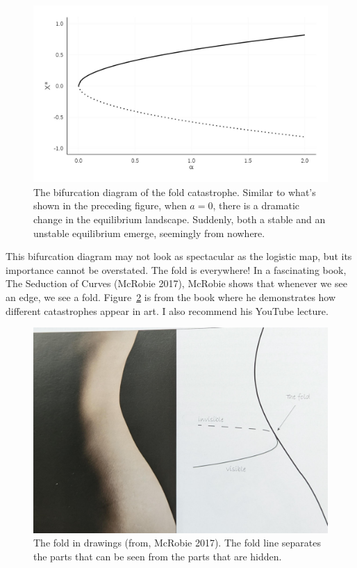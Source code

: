 \documentclass[
  a4paper,
  DIV=11,
  numbers=noendperiod]{scrreprt}
\begin{document}
\begin{figure}

{\centering \includegraphics{media/ch3/fig-ch3-img5-old-17.jpg}

}

\caption{\label{fig-ch3-img5-old-17}The bifurcation diagram of the fold
catastrophe. Similar to what's shown in the preceding figure, when
\(a=0\), there is a dramatic change in the equilibrium landscape.
Suddenly, both a stable and an unstable equilibrium emerge, seemingly
from nowhere.}

\end{figure}

This bifurcation diagram may not look as spectacular as the logistic
map, but its importance cannot be overstated. The fold is everywhere! In
a fascinating book, The Seduction of Curves (McRobie 2017), McRobie
shows that whenever we see an edge, we see a fold.
Figure~\ref{fig-ch3-img6-old-18} is from the book where he demonstrates
how different catastrophes appear in art. I also recommend his YouTube
lecture.

\begin{figure}

{\centering \includegraphics{media/ch3/image6.jpg}

}

\caption{\label{fig-ch3-img6-old-18}The fold in drawings (from, McRobie
2017). The fold line separates the parts that can be seen from the parts
that are hidden.}

\end{figure}
\end{document}
